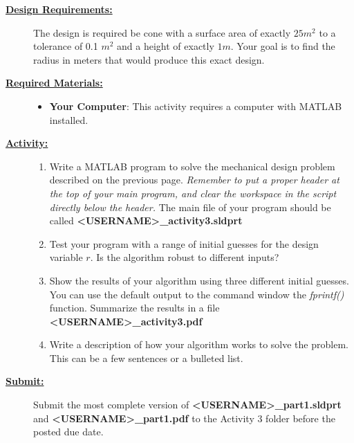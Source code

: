 \documentclass[12pt]{article}
\newcommand{\ANUM}{3} %
\begin{document}
\begin{description}
\item[\textbf{\underline{Design Requirements:}}] \hfill \vspace{0mm}

	The design is required be cone with a surface area of exactly $25 m^2$ to a tolerance of 0.1 $m^2$ and a height of exactly $1 m$. Your goal is to find the radius in meters that would produce this exact design.\\
	
\item[\textbf{\underline{Required Materials:}}] \hfill \vspace{0mm}

\begin{itemize}
	\item {\bf Your Computer}: This activity requires a computer with MATLAB installed.
\end{itemize}

\newpage

\item[\textbf{\underline{Activity:}}] \hfill \vspace{0mm}

\begin{enumerate}
	

	\item Write a MATLAB program to solve the mechanical design problem described on the previous page. {\it Remember to put a proper header at the top of your main program, and clear the workspace in the script directly below the header. } The main file of your program should be called {\bf \BL<USERNAME>\BK\_activity\ANUM.sldprt}
	
	\item Test your program with a range of initial guesses for the design variable $r$. Is the algorithm robust to different inputs? 
	
	\item Show the results of your algorithm using three different initial guesses. You can use the default output to the command window the {\it fprintf()} function. Summarize the results in a file {\bf \BL<USERNAME>\BK\_activity\ANUM.pdf }
	
	\item Write a description of how your algorithm works to solve the problem. This can be a few sentences or a bulleted list.
	
	
\end{enumerate}

\item[\textbf{\underline{Submit:}}] \hfill \vspace{0mm}

		Submit the most complete version of {\bf \BL<USERNAME>\BK\_part1.sldprt} \\and {\bf \BL<USERNAME>\BK\_part1.pdf } to the Activity \ANUM \hspace{1mm} folder before the posted due date.

\end{description}
\end{document}
